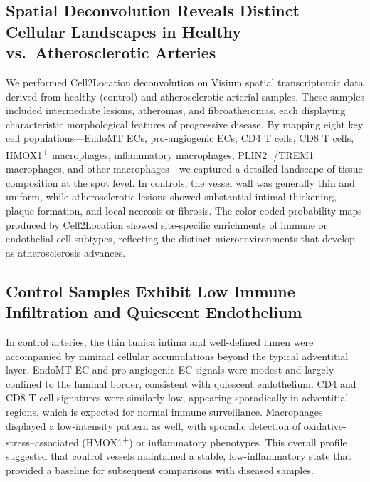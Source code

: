 \documentclass[a4paper,12pt]{article}
\begin{document}
\subsection{Spatial Deconvolution Reveals Distinct Cellular Landscapes in Healthy vs.\ Atherosclerotic Arteries}
We performed Cell2Location deconvolution on Visium spatial transcriptomic data derived from healthy (control) and atherosclerotic arterial samples. These samples included intermediate lesions, atheromas, and fibroatheromas, each displaying characteristic morphological features of progressive disease. By mapping eight key cell populations—EndoMT ECs, pro-angiogenic ECs, CD4 T cells, CD8 T cells, HMOX1\textsuperscript{+} macrophages, inflammatory macrophages, PLIN2\textsuperscript{+}/TREM1\textsuperscript{+} macrophages, and other macrophages—we captured a detailed landscape of tissue composition at the spot level. In controls, the vessel wall was generally thin and uniform, while atherosclerotic lesions showed substantial intimal thickening, plaque formation, and local necrosis or fibrosis. The color-coded probability maps produced by Cell2Location showed site-specific enrichments of immune or endothelial cell subtypes, reflecting the distinct microenvironments that develop as atherosclerosis advances.

\subsection{Control Samples Exhibit Low Immune Infiltration and Quiescent Endothelium}
In control arteries, the thin tunica intima and well-defined lumen were accompanied by minimal cellular accumulations beyond the typical adventitial layer. EndoMT EC and pro-angiogenic EC signals were modest and largely confined to the luminal border, consistent with quiescent endothelium. CD4 and CD8 T-cell signatures were similarly low, appearing sporadically in adventitial regions, which is expected for normal immune surveillance. Macrophages displayed a low-intensity pattern as well, with sporadic detection of oxidative-stress–associated (HMOX1\textsuperscript{+}) or inflammatory phenotypes. This overall profile suggested that control vessels maintained a stable, low-inflammatory state that provided a baseline for subsequent comparisons with diseased samples.
\end{document}
